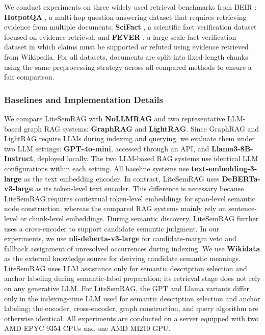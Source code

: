 \documentclass[conference]{IEEEtran}
\begin{document}
We conduct experiments on three widely used retrieval benchmarks from BEIR \cite{thakur2021beir}: \textbf{HotpotQA} \cite{yang2018hotpotqa}, a multi-hop question answering dataset that requires retrieving evidence from multiple documents; \textbf{SciFact} \cite{Wadden2020FactOF}, a scientific fact verification dataset focused on evidence retrieval; and \textbf{FEVER} \cite{thorne2018fever}, a large-scale fact verification dataset in which claims must be supported or refuted using evidence retrieved from Wikipedia. For all datasets, documents are split into fixed-length chunks using the same preprocessing strategy across all compared methods to ensure a fair comparison.

\subsubsection{Baselines and Implementation Details}

We compare LiteSemRAG with \textbf{NoLLMRAG} and two representative LLM-based graph RAG systems: \textbf{GraphRAG} and \textbf{LightRAG}. Since GraphRAG and LightRAG require LLMs during indexing and querying, we evaluate them under two LLM settings: \textbf{GPT-4o-mini}, accessed through an API, and \textbf{Llama3-8B-Instruct}, deployed locally. The two LLM-based RAG systems use identical LLM configurations within each setting.
All baseline systems use \textbf{text-embedding-3-large} as the text embedding encoder. In contrast, LiteSemRAG uses \textbf{DeBERTa-v3-large} as its token-level text encoder. This difference is necessary because LiteSemRAG requires contextual token-level embeddings for span-level semantic node construction, whereas the compared RAG systems mainly rely on sentence-level or chunk-level embeddings. During semantic discovery, LiteSemRAG further uses a cross-encoder to support candidate semantic judgment. In our experiments, we use \textbf{nli-deberta-v3-large} for candidate-margin veto and fallback assignment of unresolved occurrences during indexing. We use \textbf{Wikidata} as the external knowledge source for deriving candidate semantic meanings. LiteSemRAG uses LLM assistance only for semantic description selection and anchor labeling during semantic-label preparation; its retrieval stage does not rely on any generative LLM. For LiteSemRAG, the GPT and Llama variants differ only in the indexing-time LLM used for semantic description selection and anchor labeling; the encoder, cross-encoder, graph construction, and query algorithm are otherwise identical. All experiments are conducted on a server equipped with two AMD EPYC 9354 CPUs and one AMD MI210 GPU.
\end{document}

